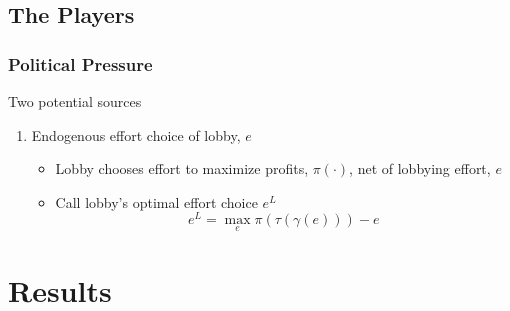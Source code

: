 \documentclass[handout]{beamer}
\newcommand{\ga}{\gamma}
\begin{document}
\subsection{The Players}


\begin{frame}
\frametitle{Political Pressure}
Two potential sources
\pause
\begin{enumerate}[<+->]
	\item Endogenous effort choice of lobby, $e$
		\begin{itemize}[<+->]
			\item Lobby chooses effort to maximize profits, $\pi(\cdot)$, net of lobbying effort, $e$
			\item Call lobby's optimal effort choice $e^L$
						\[
						  e^L = \max_e \pi(\tau(\ga(e))) - e
						\]
		\end{itemize}
\end{enumerate}

\end{frame}




\section{Results}
\end{document}
